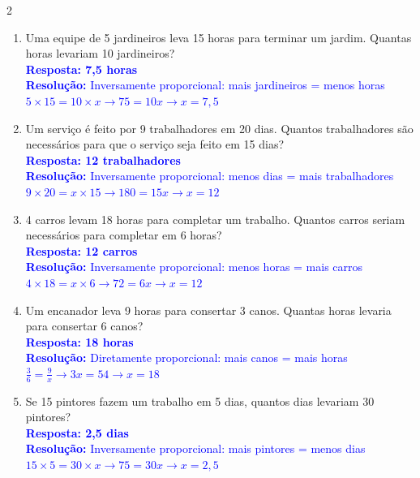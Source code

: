 \documentclass[11pt]{article}
\begin{document}
\begin{multicols}{2}
\begin{enumerate}[leftmargin=*, itemsep=2pt]
\item Uma equipe de 5 jardineiros leva 15 horas para terminar um jardim. Quantas horas levariam 10 jardineiros? \\
\textcolor{blue}{\textbf{Resposta: 7,5 horas}} \\
\textcolor{blue}{\textbf{Resolução:} Inversamente proporcional: mais jardineiros = menos horas} \\
\textcolor{blue}{$5 \times 15 = 10 \times x \rightarrow 75 = 10x \rightarrow x = 7,5$}

\item Um serviço é feito por 9 trabalhadores em 20 dias. Quantos trabalhadores são necessários para que o serviço seja feito em 15 dias? \\
\textcolor{blue}{\textbf{Resposta: 12 trabalhadores}} \\
\textcolor{blue}{\textbf{Resolução:} Inversamente proporcional: menos dias = mais trabalhadores} \\
\textcolor{blue}{$9 \times 20 = x \times 15 \rightarrow 180 = 15x \rightarrow x = 12$}

\item 4 carros levam 18 horas para completar um trabalho. Quantos carros seriam necessários para completar em 6 horas? \\
\textcolor{blue}{\textbf{Resposta: 12 carros}} \\
\textcolor{blue}{\textbf{Resolução:} Inversamente proporcional: menos horas = mais carros} \\
\textcolor{blue}{$4 \times 18 = x \times 6 \rightarrow 72 = 6x \rightarrow x = 12$}

\item Um encanador leva 9 horas para consertar 3 canos. Quantas horas levaria para consertar 6 canos? \\
\textcolor{blue}{\textbf{Resposta: 18 horas}} \\
\textcolor{blue}{\textbf{Resolução:} Diretamente proporcional: mais canos = mais horas} \\
\textcolor{blue}{$\frac{3}{6} = \frac{9}{x} \rightarrow 3x = 54 \rightarrow x = 18$}

\item Se 15 pintores fazem um trabalho em 5 dias, quantos dias levariam 30 pintores? \\
\textcolor{blue}{\textbf{Resposta: 2,5 dias}} \\
\textcolor{blue}{\textbf{Resolução:} Inversamente proporcional: mais pintores = menos dias} \\
\textcolor{blue}{$15 \times 5 = 30 \times x \rightarrow 75 = 30x \rightarrow x = 2,5$}

\end{enumerate}

\end{multicols}
\end{document}
